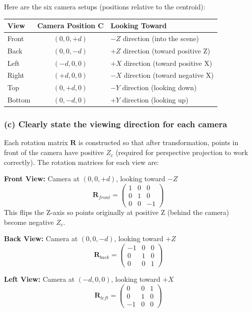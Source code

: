 \documentclass[12pt]{article}
\begin{document}
Here are the six camera setups (positions relative to the centroid):

\begin{center}
\begin{tabular}{|l|c|l|}
\hline
\textbf{View} & \textbf{Camera Position $\mathbf{C}$} & \textbf{Looking Toward} \\
\hline
Front & $(0, 0, +d)$ & $-Z$ direction (into the scene) \\
Back & $(0, 0, -d)$ & $+Z$ direction (toward positive Z) \\
Left & $(-d, 0, 0)$ & $+X$ direction (toward positive X) \\
Right & $(+d, 0, 0)$ & $-X$ direction (toward negative X) \\
Top & $(0, +d, 0)$ & $-Y$ direction (looking down) \\
Bottom & $(0, -d, 0)$ & $+Y$ direction (looking up) \\
\hline
\end{tabular}
\end{center}

\subsubsection*{(c) Clearly state the viewing direction for each camera}

Each rotation matrix $\mathbf{R}$ is constructed so that after transformation, points in front of the camera have positive $Z_c$ (required for perspective projection to work correctly). The rotation matrices for each view are:

\textbf{Front View:} Camera at $(0, 0, +d)$, looking toward $-Z$
\[
\mathbf{R}_{front} = \begin{pmatrix} 1 & 0 & 0 \\ 0 & 1 & 0 \\ 0 & 0 & -1 \end{pmatrix}
\]
This flips the Z-axis so points originally at positive Z (behind the camera) become negative $Z_c$.

\textbf{Back View:} Camera at $(0, 0, -d)$, looking toward $+Z$
\[
\mathbf{R}_{back} = \begin{pmatrix} -1 & 0 & 0 \\ 0 & 1 & 0 \\ 0 & 0 & 1 \end{pmatrix}
\]

\textbf{Left View:} Camera at $(-d, 0, 0)$, looking toward $+X$
\[
\mathbf{R}_{left} = \begin{pmatrix} 0 & 0 & 1 \\ 0 & 1 & 0 \\ -1 & 0 & 0 \end{pmatrix}
\]
\end{document}
